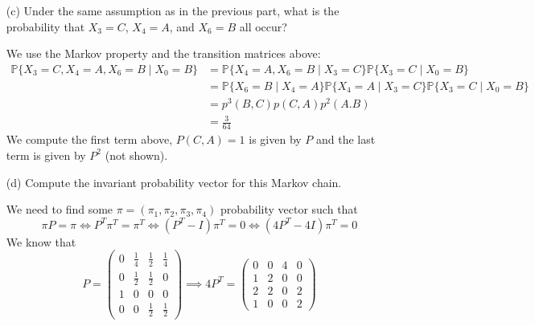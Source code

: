 \documentclass[11pt]{article}
\newcommand{\bbP}{\mathbb{P}}
\begin{document}
\begin{problem}
\begin{enumerate}
\begin{solution}
\end{solution}
    \item[(c)] Under the same assumption as in the previous part, what is the probability that \( X_3 = C \), \( X_4 = A \), and \( X_6 = B \) all occur?
\begin{solution}
We use the Markov property and the transition matrices above:
\begin{align*}
 \bbP\{X_3 = C, X_4 = A, X_6 = B \mid X_0 = B\} &= \bbP\{X_4 = A, X_6= B\mid X_3 = C\}\bbP\{X_3 = C \mid X_0 = B\}   \\
 &= \bbP\{X_6 = B \mid X_4 = A\}\bbP\{X_4 = A \mid X_3 = C\}\bbP\{X_3 = C \mid X_0 = B\}\\
 &= p^3(B,C)p(C,A)p^2(A.B)\\
 &= \frac{3}{64}
\end{align*}
We compute the first term above, $P(C,A) =1$ is given by $P$ and the last term is given by $P^2$ (not shown).
\end{solution}
    \item[(d)] Compute the invariant probability vector for this Markov chain.
\begin{solution}
    We need to find some $\pi = (\pi_1, \pi_2, \pi_3, \pi_4)$ probability vector such that 
    \[\pi P  = \pi \iff P^T\pi^T = \pi^T \iff (P^T - I)\pi^T = 0\iff (4P^T - 4I)\pi^T = 0\] 
    We know that 
    \[P = \begin{pmatrix}
0 & \frac{1}{4} & \frac{1}{2} & \frac{1}{4} \\
0 & \frac{1}{2} & \frac{1}{2} & 0 \\
1 & 0 & 0 & 0 \\
0 & 0 & \frac{1}{2} & \frac{1}{2}
\end{pmatrix} \implies 4P^T = \begin{pmatrix}
    0 &0 &4 &0\\
    1 & 2 & 0 &0 \\
    2 & 2 & 0 & 2\\
    1 & 0 & 0 & 2
\end{pmatrix}\]
    

\end{solution}
\end{enumerate}
\end{problem}
\end{document}
